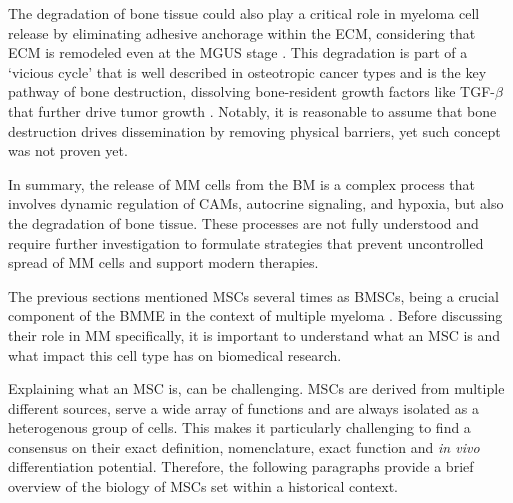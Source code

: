 The degradation of bone tissue could also play a critical role in myeloma cell
release by eliminating adhesive anchorage within the ECM, considering that
\ac{ECM} is remodeled even at the \ac{MGUS} stage
\citet{glaveyProteomicCharacterizationHuman2017}. This degradation is part of a
‘vicious cycle' that is well described in osteotropic cancer types and is the
key pathway of bone destruction, dissolving bone-resident growth factors like
TGF-$\beta$ that further drive tumor growth
\cite{haradaMyelomaBoneInteraction2021, siclariMolecularInteractionsBreast2007,
    wangProstateCancerPromotes2019}. Notably, it is reasonable to assume that bone
destruction drives dissemination by removing physical barriers, yet such concept
was not proven yet.


In summary, the release of \ac{MM} cells from the \ac{BM} is a complex process
that involves dynamic regulation of \acp{CAM}, autocrine signaling, and hypoxia,
but also the degradation of bone tissue. These processes are not fully
understood and require further investigation to formulate strategies that
prevent uncontrolled spread of \ac{MM} cells and support modern therapies.







%
\label{sec:intro_hMSCs}%
The previous sections mentioned \acp{MSC} several times as \acp{BMSC}, being a
crucial component of the \ac{BMME} in the context of multiple myeloma
\cite{mangoliniBoneMarrowStromal2020}. Before discussing their role in \ac{MM}
specifically, it is important to understand what an \ac{MSC} is and what impact
this cell type has on biomedical research.

Explaining what an \ac{MSC} is, can be challenging. MSCs
are derived from multiple different sources, serve a wide array of functions and
are always isolated as a heterogenous group of cells. This makes it particularly
challenging to find a consensus on their exact definition, nomenclature, exact
function and \textit{in vivo} differentiation potential. Therefore, the
following paragraphs provide a brief overview of the biology of MSCs set within
a historical context.

